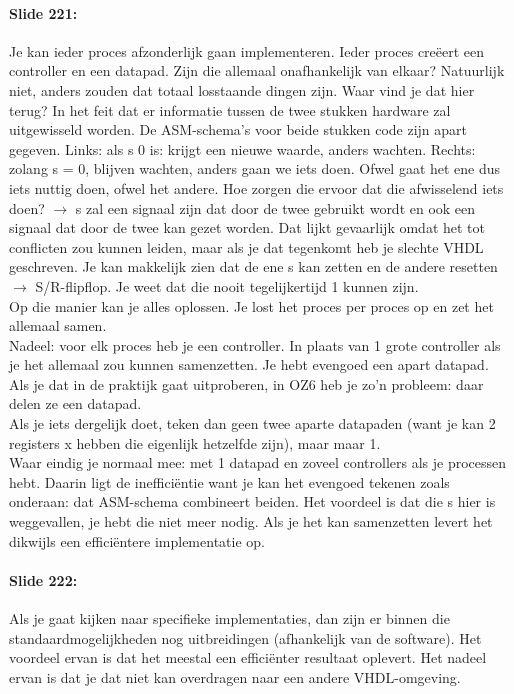 \documentclass[10pt,a4paper]{book}
\begin{document}
\paragraph{Slide 221:} Je kan ieder proces afzonderlijk gaan implementeren. Ieder proces cre\"eert een controller en een datapad. Zijn die allemaal onafhankelijk van elkaar? Natuurlijk niet, anders zouden dat totaal losstaande dingen zijn. Waar vind je dat hier terug? In het feit dat er informatie tussen de twee stukken hardware zal uitgewisseld worden. De ASM-schema's voor beide stukken code zijn apart gegeven. Links: als s 0 is: krijgt een nieuwe waarde, anders wachten. Rechts: zolang s = 0, blijven wachten, anders gaan we iets doen. Ofwel gaat het ene dus iets nuttig doen, ofwel het andere. Hoe zorgen die ervoor dat die afwisselend iets doen? $\rightarrow$ s zal een signaal zijn dat door de twee gebruikt wordt en ook een signaal dat door de twee kan gezet worden. Dat lijkt gevaarlijk omdat het tot conflicten zou kunnen leiden, maar als je dat tegenkomt heb je slechte VHDL geschreven. Je kan makkelijk zien dat de ene s kan zetten en de andere resetten $\rightarrow$ S/R-flipflop. Je weet dat die nooit tegelijkertijd 1 kunnen zijn.\\
Op die manier kan je alles oplossen. Je lost het proces per proces op en zet het allemaal samen.\\
Nadeel: voor elk proces heb je een controller. In plaats van 1 grote controller als je het allemaal zou kunnen samenzetten. Je hebt evengoed een apart datapad. Als je dat in de praktijk gaat uitproberen, in OZ6 heb je zo'n probleem: daar delen ze een datapad.\\
Als je iets dergelijk doet, teken dan geen twee aparte datapaden (want je kan 2 registers x hebben die eigenlijk hetzelfde zijn), maar maar 1.\\
Waar eindig je normaal mee: met 1 datapad en zoveel controllers als je processen hebt. Daarin ligt de ineffici\"entie want je kan het evengoed tekenen zoals onderaan: dat ASM-schema combineert beiden. Het voordeel is dat die s hier is weggevallen, je hebt die niet meer nodig. Als je het kan samenzetten levert het dikwijls een effici\"entere implementatie op.

\paragraph{Slide 222:} Als je gaat kijken naar specifieke implementaties, dan zijn er binnen die standaardmogelijkheden nog uitbreidingen (afhankelijk van de software). Het voordeel ervan is dat het meestal een effici\"enter resultaat oplevert. Het nadeel ervan is dat je dat niet kan overdragen naar een andere VHDL-omgeving.
\end{document}
